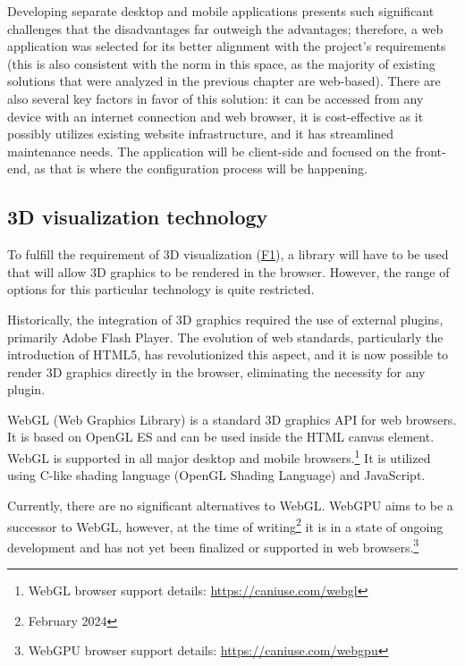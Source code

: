Developing separate desktop and mobile applications presents such significant challenges that the disadvantages far outweigh the advantages; therefore, a web application was selected for its better alignment with the project's requirements (this is also consistent with the norm in this space, as the majority of existing solutions that were analyzed in the previous chapter are web-based). There are also several key factors in favor of this solution: it can be accessed from any device with an internet connection and web browser, it is cost-effective as it possibly utilizes existing website infrastructure, and it has streamlined maintenance needs. The application will be client-side and focused on the front-end, as that is where the configuration process will be happening.


\subsection{3D visualization technology}

To fulfill the requirement of 3D visualization (\hyperref[itm:F1]{F1}), a library will have to be used that will allow 3D graphics to be rendered in the browser. However, the range of options for this particular technology is quite restricted.

Historically, the integration of 3D graphics required the use of external plugins, primarily Adobe Flash Player. The evolution of web standards, particularly the introduction of HTML5, has revolutionized this aspect, and it is now possible to render 3D graphics directly in the browser, eliminating the necessity for any plugin. \cite{Parisi2014}

WebGL (Web Graphics Library) is a standard 3D graphics API for web browsers. It is based on OpenGL ES and can be used inside the HTML canvas element. WebGL is supported in all major desktop and mobile browsers.\footnote{WebGL browser support details: \url{https://caniuse.com/webgl}} It is utilized using C-like shading language (OpenGL Shading Language) and JavaScript. \cite{Parisi2012}

Currently, there are no significant alternatives to WebGL. WebGPU aims to be a successor to WebGL, however, at the time of writing\footnote{February 2024} it is in a state of ongoing development and has not yet been finalized or supported in web browsers.\footnote{WebGPU browser support details: \url{https://caniuse.com/webgpu}} \cite{WebGPU}


